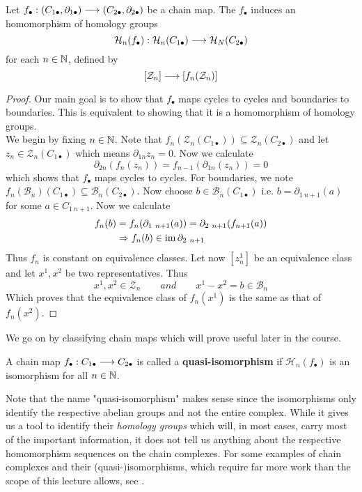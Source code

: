 \begin{lem}
  Let $f_\bullet :(C_{1\bullet}, \partial_{1\bullet}) \longrightarrow (C_{2\bullet}, \partial_{2\bullet})$ be a chain map. The $f_\bullet$ induces an homomorphism of homology groups
  $$ \mathcal{H}_n (f_\bullet): \mathcal{H}_n(C_{1\bullet}) \longrightarrow \mathcal{H}_N (C_{2\bullet})  $$
  for each $n \in \mathbb{N}$, defined by
  $$ [\mathcal{Z}_n] \longrightarrow [f_n(\mathcal{Z}_n)] $$
\begin{proof}
  Our main goal is to show that $f_\bullet$ maps cycles to cycles and boundaries to boundaries. This is equivalent to showing that it is a homomorphism of homology groups.\\

  We begin by fixing $n\in \mathbb{N}$. Note that $f_n(\mathcal{Z}_n(C_{1\bullet})) \subseteq \mathcal{Z}_n(C_{2\bullet}) $ and let $z_n \in \mathcal{Z}_n(C_{1\bullet})$ which means $\partial_{1n}z_n = 0$. Now we calculate
  $$ \partial_{2n}(f_n(z_n)) = f_{n-1}(\partial_{1n}(z_n)) = 0 $$
  which shows that $f_\bullet$ maps cycles to cycles. For boundaries, we note $f_n(\mathcal{B}_n)(C_{1\bullet}) \subseteq \mathcal{B}_n(C_{2\bullet})$. Now choose $b\in \mathcal{B}_n(C_{1\bullet})$ i.e. $b = \partial_{1 \ n+1}(a)$ for some $a \in C_{1 \ n+1}$. Now we calculate
  \begin{align*}
    f_n(b) &= f_n(\partial_{1 \ n+1}(a)) = \partial_{2 \ n+1}(f_{n+1}(a))\\
    &\Rightarrow f_n(b) \in \im \partial_{2 \ n+1}
  \end{align*}
  Thus $f_n$ is constant on equivalence classes. Let now $[z^1_n]$ be an equivalence class and let $x^1, x^2$ be two representatives. Thus
  $$ x^1, x^2 \in \mathcal{Z}_n \quad \quad and \quad \quad x^1-x^2 = b  \in \mathcal{B}_n$$
  Which proves that the equivalence class of $f_n(x^1)$ is the same as that of $f_n(x^2)$.
\end{proof}
\end{lem}


We go on by classifying chain maps which will prove useful later in the course.

\begin{definition}
  A chain map $f_\bullet : C_{1\bullet} \longrightarrow C_{2\bullet}$ is called a \textbf{quasi-isomorphism} if $\mathcal{H}_n(f_\bullet)$ is an isomorphism for all $n \in \mathbb{N}$.
\end{definition}

Note that the name "quasi-isomorphism" makes sense since the isomorphisms only identify the respective abelian groups and not the entire complex. While it gives us a tool to identify their \emph{homology groups} which will, in most cases, carry most of the important information, it does not tell us anything about the respective homomorphism sequences on the chain complexes. For some examples of chain complexes and their (quasi-)isomorphisms, which require far more work than the scope of this lecture allows, see .

